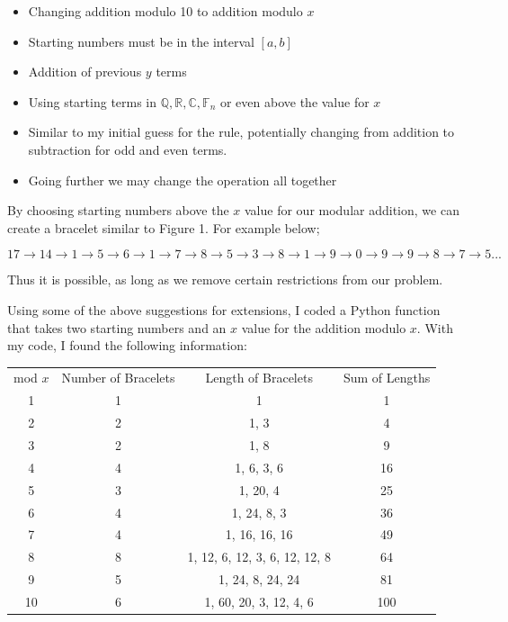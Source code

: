 \documentclass[11pt]{article}
\begin{document}
\begin{itemize}
    \item Changing addition modulo 10 to addition modulo $x$
    \item Starting numbers must be in the interval $[a, b]$
    \item Addition of previous $y$ terms
    \item Using starting terms in $\mathbb{Q}, \mathbb{R}, \mathbb{C}, \mathbb{F}_n$ or even above the value for $x$
    \item Similar to my initial guess for the rule, potentially changing from addition to subtraction for odd and even terms.
    \item Going further we may change the operation all together
\end{itemize}

By choosing starting numbers above the $x$ value for our modular addition, we can create a bracelet similar to Figure 1. For example below;

\[
17 \rightarrow 14 \rightarrow 1 \rightarrow 5 \rightarrow 6 \rightarrow 1 \rightarrow 7 \rightarrow 8 \rightarrow 5 \rightarrow 3 \rightarrow 8 \rightarrow 1 \rightarrow 9 \rightarrow 0 \rightarrow 9 \rightarrow 9 \rightarrow 8 \rightarrow 7 \rightarrow 5  ...
\]

Thus it is possible, as long as we remove certain restrictions from our problem.

Using some of the above suggestions for extensions, I coded a Python function that takes two starting numbers and an $x$ value for the addition modulo $x$. With my code, I found the following information:

\begin{table} [h]
    \centering
    \begin{tabular}{cccc}
        mod $x$ & Number of Bracelets & Length of Bracelets & Sum of Lengths\\
        1 & 1 & 1 & 1\\  
        2 & 2 & 1, 3 & 4\\
        3 & 2 & 1, 8 & 9\\
        4 & 4 & 1, 6, 3, 6 & 16\\
        5 & 3 & 1, 20, 4 & 25\\
        6 & 4 & 1, 24, 8, 3 & 36\\
        7 & 4 & 1, 16, 16, 16 & 49\\
        8 & 8 & 1, 12, 6, 12, 3, 6, 12, 12, 8 & 64\\
        9 & 5 & 1, 24, 8, 24, 24 & 81\\
        10 & 6 & 1, 60, 20, 3, 12, 4, 6 & 100\\      
    \end{tabular}
\end{table}
\end{document}
